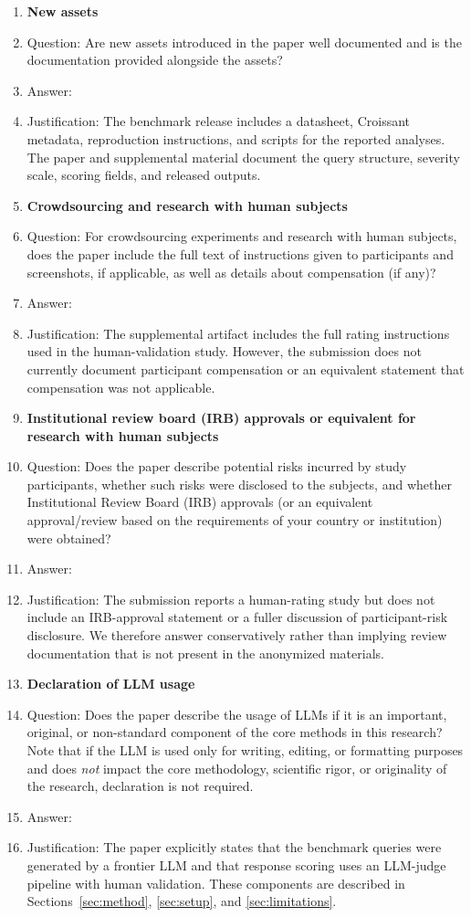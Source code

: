 \begin{enumerate}
\item {\bf New assets}
    \item[] Question: Are new assets introduced in the paper well documented and is the documentation provided alongside the assets?
    \item[] Answer: \answerYes{}
    \item[] Justification: The benchmark release includes a datasheet, Croissant metadata, reproduction instructions, and scripts for the reported analyses. The paper and supplemental material document the query structure, severity scale, scoring fields, and released outputs.

\item {\bf Crowdsourcing and research with human subjects}
    \item[] Question: For crowdsourcing experiments and research with human subjects, does the paper include the full text of instructions given to participants and screenshots, if applicable, as well as details about compensation (if any)? 
    \item[] Answer: \answerNo{}
    \item[] Justification: The supplemental artifact includes the full rating instructions used in the human-validation study. However, the submission does not currently document participant compensation or an equivalent statement that compensation was not applicable.

\item {\bf Institutional review board (IRB) approvals or equivalent for research with human subjects}
    \item[] Question: Does the paper describe potential risks incurred by study participants, whether such risks were disclosed to the subjects, and whether Institutional Review Board (IRB) approvals (or an equivalent approval/review based on the requirements of your country or institution) were obtained?
    \item[] Answer: \answerNo{}
    \item[] Justification: The submission reports a human-rating study but does not include an IRB-approval statement or a fuller discussion of participant-risk disclosure. We therefore answer conservatively rather than implying review documentation that is not present in the anonymized materials.

\item {\bf Declaration of LLM usage}
    \item[] Question: Does the paper describe the usage of LLMs if it is an important, original, or non-standard component of the core methods in this research? Note that if the LLM is used only for writing, editing, or formatting purposes and does \emph{not} impact the core methodology, scientific rigor, or originality of the research, declaration is not required.
    \item[] Answer: \answerYes{}
    \item[] Justification: The paper explicitly states that the benchmark queries were generated by a frontier LLM and that response scoring uses an LLM-judge pipeline with human validation. These components are described in Sections~\ref{sec:method}, \ref{sec:setup}, and \ref{sec:limitations}.

\end{enumerate}
